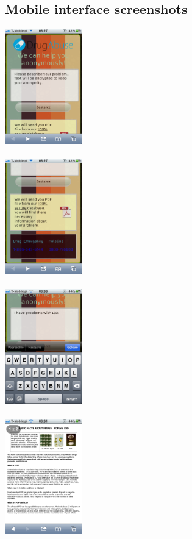 \documentclass[a4paper,12pt, twocolumn]{article}
\begin{document}
\subsection{Mobile interface screenshots}
\begin{center}

\includegraphics[width=0.25\textwidth]{images/MobileHomeScreen1.PNG}
\label{mobile1}
~\\~\\

\includegraphics[width=0.25\textwidth]{images/MobileHomeScreen2.png}
\label{mobile2}
~\\~\\

\includegraphics[width=0.25\textwidth]{images/MobileProblemDescription.png}
\label{mobile3}
~\\~\\

\includegraphics[width=0.25\textwidth]{images/MobileProblemSolution.png}
\label{mobile4}

\end{center}
\end{document}
